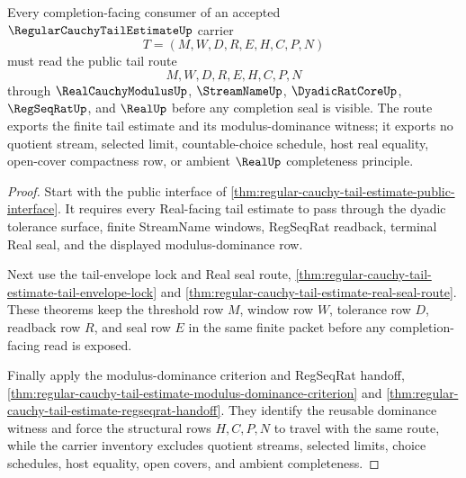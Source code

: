 \begin{theorem}
\label{thm:regular-cauchy-tail-estimate-public-tail-export}
Every completion-facing consumer of an accepted $\RegularCauchyTailEstimateUp$ carrier
$$
T=(M,W,D,R,E,H,C,P,N)
$$
must read the public tail route
$$
M,W,D,R,E,H,C,P,N
$$
through $\RealCauchyModulusUp$, $\StreamNameUp$, $\DyadicRatCoreUp$, $\RegSeqRatUp$, and $\RealUp$ before any completion seal is visible. The route exports the finite tail estimate and its modulus-dominance witness; it exports no quotient stream, selected limit, countable-choice schedule, host real equality, open-cover compactness row, or ambient $\RealUp$ completeness principle.
\end{theorem}
\begin{proof}
Start with the public interface of \autoref{thm:regular-cauchy-tail-estimate-public-interface}. It requires every Real-facing tail estimate to pass through the dyadic tolerance surface, finite StreamName windows, RegSeqRat readback, terminal Real seal, and the displayed modulus-dominance row.

Next use the tail-envelope lock and Real seal route, \autoref{thm:regular-cauchy-tail-estimate-tail-envelope-lock} and \autoref{thm:regular-cauchy-tail-estimate-real-seal-route}. These theorems keep the threshold row $M$, window row $W$, tolerance row $D$, readback row $R$, and seal row $E$ in the same finite packet before any completion-facing read is exposed.

Finally apply the modulus-dominance criterion and RegSeqRat handoff, \autoref{thm:regular-cauchy-tail-estimate-modulus-dominance-criterion} and \autoref{thm:regular-cauchy-tail-estimate-regseqrat-handoff}. They identify the reusable dominance witness and force the structural rows $H,C,P,N$ to travel with the same route, while the carrier inventory excludes quotient streams, selected limits, choice schedules, host equality, open covers, and ambient completeness.
\end{proof}

